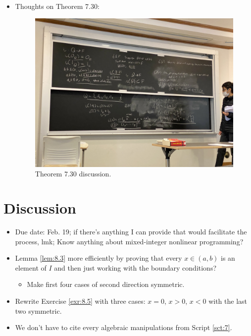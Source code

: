 \documentclass{report}
\begin{document}
\begin{itemize}
    \item {}Thoughts on Theorem 7.30:
    \begin{figure}[h!]
        \centering
        \includegraphics[width=0.5\linewidth]{ExtFiles/theorem7-30.JPG}
        \caption{Theorem 7.30 discussion.}
        \label{fig:theorem7-30}
    \end{figure}
\end{itemize}






\section{Discussion}
\begin{itemize}
    \item {}Due date: Feb. 19; if there's anything I can provide that would facilitate the process, lmk; Know anything about mixed-integer nonlinear programming?
    \item Lemma \ref{lem:8.3} more efficiently by proving that every $x\in(a,b)$ is an element of $I$ and then just working with the boundary conditions?
    \begin{itemize}
        \item Make first four cases of second direction symmetric.
    \end{itemize}
    \item Rewrite Exercise \ref{exr:8.5} with three cases: $x=0$, $x>0$, $x<0$ with the last two symmetric.
    \item We don't have to cite every algebraic manipulations from Script \ref{sct:7}.
\end{itemize}
\end{document}
